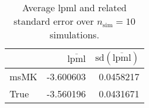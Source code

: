\begin{table}[H]

\caption{Average lpml and related standard error over $n_{\text{sim}} = 10$ simulations.}
\centering
\begin{tabular}[t]{lrr}
\toprule
  & $\overbar{\text{lpml}}$ & $\text{sd}(\overbar{\text{lpml}})$\\
\midrule
msMK & -3.600603 & 0.0458217\\
True & -3.560196 & 0.0431671\\
\bottomrule
\end{tabular}
\end{table}